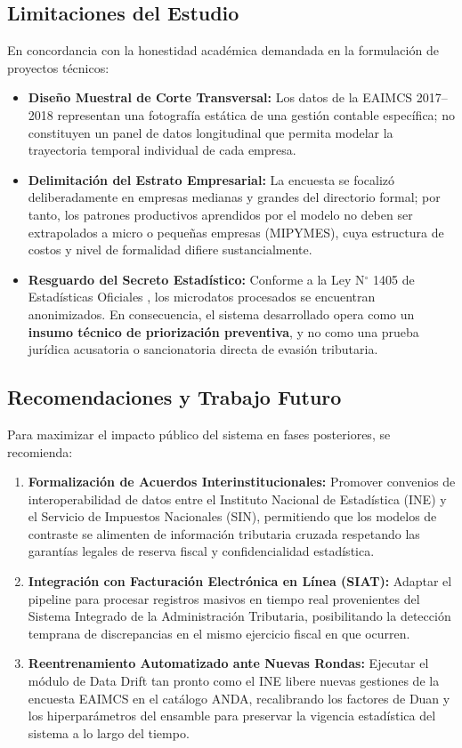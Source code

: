 \subsection{Limitaciones del Estudio}
En concordancia con la honestidad académica demandada en la formulación de proyectos técnicos:
\begin{itemize}
    \item \textbf{Diseño Muestral de Corte Transversal:} Los datos de la EAIMCS 2017--2018 representan una fotografía estática de una gestión contable específica; no constituyen un panel de datos longitudinal que permita modelar la trayectoria temporal individual de cada empresa.
    \item \textbf{Delimitación del Estrato Empresarial:} La encuesta se focalizó deliberadamente en empresas medianas y grandes del directorio formal; por tanto, los patrones productivos aprendidos por el modelo no deben ser extrapolados a micro o pequeñas empresas (MIPYMES), cuya estructura de costos y nivel de formalidad difiere sustancialmente.
    \item \textbf{Resguardo del Secreto Estadístico:} Conforme a la Ley N$^\circ$ 1405 de Estadísticas Oficiales \citep{ley1405}, los microdatos procesados se encuentran anonimizados. En consecuencia, el sistema desarrollado opera como un \textbf{insumo técnico de priorización preventiva}, y no como una prueba jurídica acusatoria o sancionatoria directa de evasión tributaria.
\end{itemize}

\subsection{Recomendaciones y Trabajo Futuro}
Para maximizar el impacto público del sistema en fases posteriores, se recomienda:
\begin{enumerate}
    \item \textbf{Formalización de Acuerdos Interinstitucionales:} Promover convenios de interoperabilidad de datos entre el Instituto Nacional de Estadística (INE) y el Servicio de Impuestos Nacionales (SIN), permitiendo que los modelos de contraste se alimenten de información tributaria cruzada respetando las garantías legales de reserva fiscal y confidencialidad estadística.
    \item \textbf{Integración con Facturación Electrónica en Línea (SIAT):} Adaptar el pipeline para procesar registros masivos en tiempo real provenientes del Sistema Integrado de la Administración Tributaria, posibilitando la detección temprana de discrepancias en el mismo ejercicio fiscal en que ocurren.
    \item \textbf{Reentrenamiento Automatizado ante Nuevas Rondas:} Ejecutar el módulo de Data Drift tan pronto como el INE libere nuevas gestiones de la encuesta EAIMCS en el catálogo ANDA, recalibrando los factores de Duan y los hiperparámetros del ensamble para preservar la vigencia estadística del sistema a lo largo del tiempo.
\end{enumerate}
